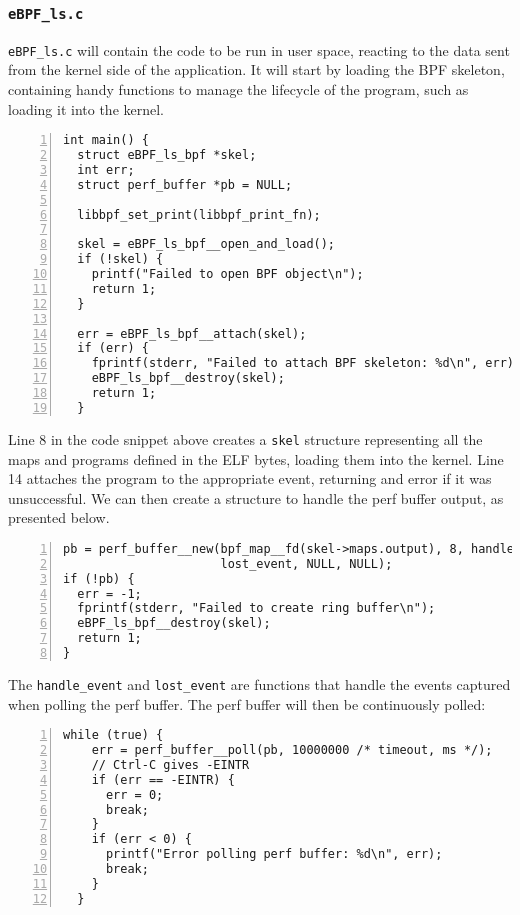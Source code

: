 \subsubsection{\texttt{eBPF\_ls.c}}
\texttt{eBPF\_ls.c} will contain the code to be run in user space, reacting to the data sent from the kernel side of the application. It will start by loading the BPF skeleton, containing handy functions to manage the lifecycle of the program, such as loading it into the kernel. 
\begin{lstlisting}[numbers=left]
int main() {
  struct eBPF_ls_bpf *skel;
  int err;
  struct perf_buffer *pb = NULL;

  libbpf_set_print(libbpf_print_fn);

  skel = eBPF_ls_bpf__open_and_load();
  if (!skel) {
    printf("Failed to open BPF object\n");
    return 1;
  }

  err = eBPF_ls_bpf__attach(skel);
  if (err) {
    fprintf(stderr, "Failed to attach BPF skeleton: %d\n", err);
    eBPF_ls_bpf__destroy(skel);
    return 1;
  }

\end{lstlisting}

Line 8 in the code snippet above creates a \texttt{skel} structure representing all the maps and programs defined in the ELF bytes, loading them into the kernel. Line 14 attaches the program to the appropriate event, returning and error if it was unsuccessful.
We can then create a structure to handle the perf buffer output, as presented below. 
\begin{lstlisting}[numbers=left]
pb = perf_buffer__new(bpf_map__fd(skel->maps.output), 8, handle_event,
                      lost_event, NULL, NULL);
if (!pb) {
  err = -1;
  fprintf(stderr, "Failed to create ring buffer\n");
  eBPF_ls_bpf__destroy(skel);
  return 1;
}
\end{lstlisting}
The \texttt{handle\_event} and \texttt{lost\_event} are functions that handle the events captured when polling the perf buffer. 
The perf buffer will then be continuously polled: 
\begin{lstlisting}[numbers=left]
while (true) {
    err = perf_buffer__poll(pb, 10000000 /* timeout, ms */);
    // Ctrl-C gives -EINTR
    if (err == -EINTR) {
      err = 0;
      break;
    }
    if (err < 0) {
      printf("Error polling perf buffer: %d\n", err);
      break;
    }
  }
\end{lstlisting}


